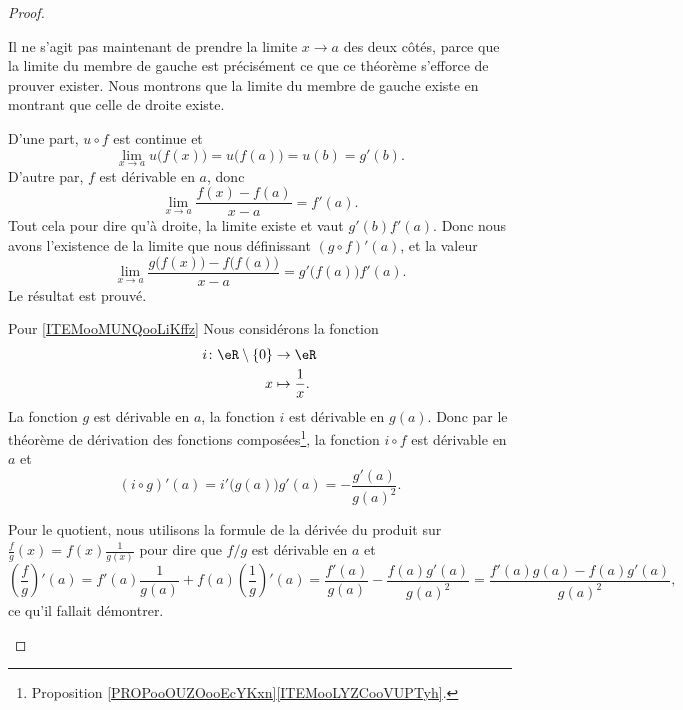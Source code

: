 \begin{proof}
\begin{subproof}
            Il ne s'agit pas maintenant de prendre la limite \( x\to a\) des deux côtés, parce que la limite du membre de gauche est précisément ce que ce théorème s'efforce de prouver exister. Nous montrons que la limite du membre de gauche existe en montrant que celle de droite existe. 
            
            D'une part, \( u\circ f\) est continue et
            \begin{equation}
                \lim_{x\to a} u\big( f(x) \big)=u\big( f(a) \big)=u(b)=g'(b).
            \end{equation}
            D'autre par, \( f\) est dérivable en \( a\), donc
            \begin{equation}
                \lim_{x\to a} \frac{ f(x)-f(a) }{ x-a }=f'(a).
            \end{equation}
            Tout cela pour dire qu'à droite, la limite existe et vaut \( g'(b)f'(a)\). Donc nous avons l'existence de la limite que nous définissant \( (g\circ f)'(a)\), et la valeur
            \begin{equation}
                \lim_{x\to a} \frac{ g\big( f(x) \big)-f\big( f(a) \big) }{ x-a }= g'\big( f(a) \big)f'(a).
            \end{equation}
            Le résultat est prouvé.
        \item[Pour \ref{ITEMooMUNQooLiKffz}]
            Nous considérons la fonction
            \begin{equation}
                \begin{aligned}
                    i\colon \eR\setminus\{ 0 \}&\to \eR \\
                    x&\mapsto \frac{1}{ x }. 
                \end{aligned}
            \end{equation}
            La fonction \( g\) est dérivable en \( a\), la fonction \( i\) est dérivable en \( g(a)\). Donc par le théorème de dérivation des fonctions composées\footnote{Proposition \ref{PROPooOUZOooEcYKxn}\ref{ITEMooLYZCooVUPTyh}.}, la fonction \( i\circ f\) est dérivable en \( a\) et
            \begin{equation}
                (i\circ g)'(a)=i'\big( g(a) \big)g'(a)=-\frac{ g'(a) }{ g(a)^2 }.
            \end{equation}
            
            Pour le quotient, nous utilisons la formule de la dérivée du produit sur \( \frac{ f }{ g }(x)=f(x)\frac{1}{ g(x) } \) pour dire que \( f/g\) est dérivable en \( a\) et
            \begin{equation}
                    \left( \frac{ f }{ g } \right)'(a)=f'(a)\frac{1}{ g(a) }+f(a)\left( \frac{1}{ g } \right)'(a)
                    =\frac{ f'(a) }{ g(a) }-\frac{ f(a)g'(a) }{ g(a)^2 }
                    =\frac{ f'(a)g(a)-f(a)g'(a) }{ g(a)^2 },
            \end{equation}
            ce qu'il fallait démontrer.
    \end{subproof}
\end{proof}

